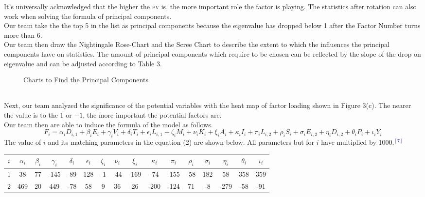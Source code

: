 \documentclass[12pt]{article}
\begin{document}
{It's universally acknowledged that the higher the {\textsc{pv}} is, the more important role the factor is playing. The statistics after rotation can also work when solving the formula of principal components.\\[2ex]
Our team take the the top 5 in the list as principal components because the eigenvalue has dropped below 1 after the Factor Number turns more than 6.\\[4ex]
Our team then draw the Nightingale Rose-Chart and the Scree Chart to describe the extent to which the influences the principal components have on statistics. The amount of principal components which require to be chosen can be reflected by the slope of the drop on eigenvalue and can be adjusted according to Table 3.\\[2ex]
\begin{figure}[htbp]
\centering
{}
	\caption{Charts to Find the Principal Components}
\end{figure}\\
Next, our team analyzed the significance of the potential variables with the heat map of factor loading shown in Figure 3(c). The nearer the value is to the 1 or $-1$, the more important the potential factors are.\\[2ex]
Our team then are able to induce the formula of the model as follows.
\begin{equation}
F_i=\alpha_i D_{i,1}+\beta_i E_i+\gamma_i V_i+\delta_i T_i+\epsilon_i L_{i,1}+\zeta_i M_i+\nu_i K_i+\xi_i A_i+\kappa_i I_i+\pi_i L_{i,2}+\rho_i S_i+\sigma_i E_{i,2}+\eta_i D_{i,2}+\theta_i P_i+\iota_i Y_i
\end{equation}
The value of $i$ and its matching parameters in the equation (2) are shown below. All parameters but for $i$ have multiplied by 1000.\textcolor{blue}{$^{[7]}$}
\begin{table}[htp]
\centering
\begin{tabular}{|c||c|c|c|c|c|c|c|c|c|c|c|c|c|c|c|}
\hline
$i$ &$\alpha_i$ &$\beta_i$ &$\gamma_i$ &$\delta_i$ &$\epsilon_i$ &$\zeta_i$ &$\nu_i$ &$\xi_i$ &$\kappa_i$ &$\pi_i$ &$\rho_i$ &$\sigma_i$ &$\eta_i$ &$\theta_i$ &$\iota_i$\\
\hline
\hline
	1 &38 &77 &-145 &-89 &128 &-1 &-44 &-169 &-74 &-155 &-58 &182 &58 &358 &359\\
	\hline
	2 &469 &20 &449 &-78 &58 &9 &36 &26 &-200 &-124 &71 &-8 &-279 &-58 &-91\\

\end{tabular}
\end{table}}
\end{document}
